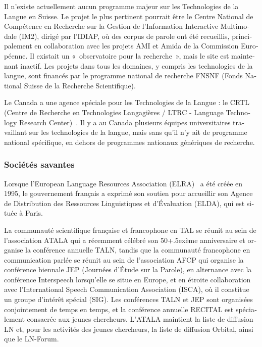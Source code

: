 \begin{french}
\begin{multicols}{2}
Il n'existe actuellement aucun programme majeur sur les Technologies
de la Langue en Suisse. Le projet le plus pertinent pourrait être le
Centre National de Compétence en Recherche sur la Gestion de
l'Information Interactive Multimodale (IM2), dirigé par l'IDIAP, où
des corpus de parole ont été recueillis, principalement en
collaboration avec les projets AMI et Amida de la Commission Européenne. Il existait un
«~observatoire pour la recherche~», mais le site est maintenant
inactif. Les projets dans tous les domaines, y compris les
technologies de la langue, sont financés par le programme national de
recherche FNSNF (Fonds National Suisse de la Recherche Scientifique).

Le Canada a une agence spéciale pour les Technologies de la Langue :
le CRTL (Centre de Recherche en Technologies Langagières / LTRC -
Language Technology Research Center)~\cite{canadacrtl}. Il y a au
Canada plusieurs équipes universitaires travaillant sur les
technologies de la langue, mais sans qu'il n'y ait de
programme national spécifique, en dehors de programmes nationaux
génériques de recherche.

\subsubsection{Sociétés savantes}

Lorsque l'European Language Resources Association (ELRA)~\cite{elra} a été créée
en 1995, le gouvernement français a exprimé son soutien pour
accueillir son Agence de Distribution des Ressources Linguistiques et
d'Évaluation (ELDA), qui est située à Paris.

La communauté scientifique française et francophone en TAL se réunit
au sein de l'association ATALA qui a récemment célébré son
50\raise+.5ex\hbox{ème} anniversaire et organise la conférence
annuelle TALN, tandis que la communauté francophone en communication
parlée se réunit au sein de l'association AFCP qui organise la
conférence biennale JEP (Journées d'Étude sur la Parole), en
alternance avec la conférence Interspeech lorsqu'elle se situe en
Europe, et en étroite collaboration avec l'International Speech
Communication Association (ISCA), où il constitue un groupe d'intérêt
spécial (SIG). Les conférences TALN et JEP sont organisées
conjointement de temps en temps, et la conférence annuelle RECITAL est
spécialement consacrée aux jeunes chercheurs. L'ATALA maintient la
liste de diffusion LN et, pour les activités des jeunes chercheurs, la
liste de diffusion Orbital, ainsi que le LN-Forum.


\end{multicols}
\end{french}
